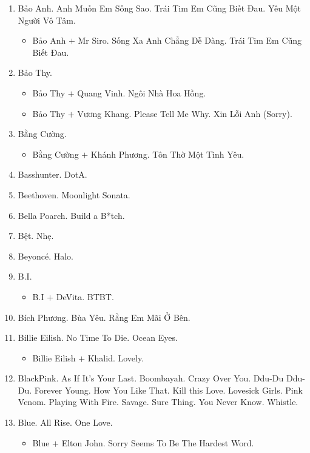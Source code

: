 \documentclass{article}
\begin{document}
\begin{enumerate}
	\item {\sc Bảo Anh.} Anh Muốn Em Sống Sao. Trái Tim Em Cũng Biết Đau. Yêu Một Người Vô Tâm.
	\begin{itemize}
		\item {\sc Bảo Anh $+$ Mr Siro.} Sống Xa Anh Chẳng Dễ Dàng. Trái Tim Em Cũng Biết Đau.
	\end{itemize}
	\item {\sc Bảo Thy.}
	\begin{itemize}
		\item {\sc Bảo Thy $+$ Quang Vinh.} Ngôi Nhà Hoa Hồng.
		\item {\sc Bảo Thy $+$ Vương Khang.} Please Tell Me Why. Xin Lỗi Anh (Sorry).
	\end{itemize}
	\item {\sc Bằng Cường.}
	\begin{itemize}
		\item {\sc Bằng Cường $+$ Khánh Phương.} Tôn Thờ Một Tình Yêu.
	\end{itemize}
	\item {\sc Basshunter.} DotA.
	\item {\sc Beethoven.} Moonlight Sonata.
	\item {\sc Bella Poarch.} Build a B*tch.
	\item {\sc Bệt.} Nhẹ.
	\item {\sc Beyonc\'e.} Halo.
	\item {\sc B.I.}
	\begin{itemize}
		\item {\sc B.I $+$ DeVita.} BTBT.
	\end{itemize}
	\item {\sc Bích Phương.} Bùa Yêu. Rằng Em Mãi Ở Bên.
	\item {\sc Billie Eilish.} No Time To Die. Ocean Eyes.
	\begin{itemize}
		\item {\sc Billie Eilish $+$ Khalid.} Lovely.
	\end{itemize}
	\item {\sc BlackPink.} As If It's Your Last. Boombayah. Crazy Over You. Ddu-Du Ddu-Du. Forever Young. How You Like That. Kill this Love. Lovesick Girls. Pink Venom. Playing With Fire. Savage. Sure Thing. You Never Know. Whistle.
	\item {\sc Blue.} All Rise. One Love.
	\begin{itemize}
		\item {\sc Blue $+$ Elton John.} Sorry Seems To Be The Hardest Word.
	\end{itemize}

\end{enumerate}
\end{document}
